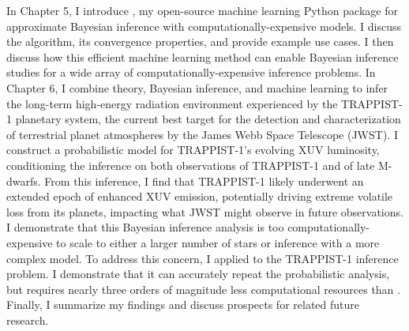 In Chapter 5, I introduce \approxposterior, my open-source machine learning Python package for approximate Bayesian inference with computationally-expensive models. I discuss the algorithm, its convergence properties, and provide example use cases. I then discuss how this efficient machine learning method can enable Bayesian inference studies for a wide array of computationally-expensive inference problems. In Chapter 6, I combine theory, Bayesian inference, and machine learning to infer the long-term high-energy radiation environment experienced by the TRAPPIST-1 planetary system, the current best target for the detection and characterization of terrestrial planet atmospheres by the James Webb Space Telescope (JWST). I construct a probabilistic model for TRAPPIST-1's evolving XUV luminosity, conditioning the inference on both observations of TRAPPIST-1 and of late M-dwarfs. From this inference, I find that TRAPPIST-1 likely underwent an extended epoch of enhanced XUV emission, potentially driving extreme volatile loss from its planets, impacting what JWST might observe in future observations. I demonstrate that this Bayesian inference analysis is too computationally-expensive to scale to either a larger number of stars or inference with a more complex model. To address this concern, I applied \approxposterior to the TRAPPIST-1 inference problem. I demonstrate that it can accurately repeat the probabilistic analysis, but requires nearly three orders of magnitude less computational resources than \emcee.  Finally, I summarize my findings and discuss prospects for related future research.

